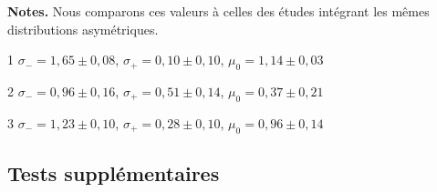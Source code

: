 \documentclass[../main/main.tex]{subfiles}
\begin{document}
\begin{table}
    \centering
        \caption[Paramètres de meilleur ajustement pour notre modélisation
        asymétrique par échantillon de la distribution d'étirement
        sous-jacente]{Paramètres de meilleur ajustement pour notre modélisation
        asymétrique par échantillon de la distribution d'étirement sous-jacente.}
        \label{tab:bbc}
    \begin{threeparttable}
        \begin{tablenotes}[flushleft]
            \item\small \textbf{\hspace{-3,2pt}Notes.} Nous comparons ces
                valeurs à celles des études intégrant les mêmes distributions
                asymétriques.
            \item [1]\small $\sigma_{-} = 1,65 \pm 0,08$, $\sigma_{+} = 0,10 \pm
                0,10$, $\mu_0 = 1,14 \pm 0,03$ \citep[Tableau~1,][]{scolnic2016}
            \item [2]\small $\sigma_{-} = 0,96 \pm 0,16$, $\sigma_{+} = 0,51 \pm
                0,14$, $\mu_0 = 0,37 \pm 0,21$ \citep[Tableau~3,][]{scolnic2018}
            \item [3]\small $\sigma_{-} = 1,23 \pm 0,10$, $\sigma_{+} = 0,28 \pm
                0,10$, $\mu_0 = 0,96 \pm 0,14$ \citep[Tableau~1,][]{scolnic2016}
        \end{tablenotes}
    \end{threeparttable}
\end{table}

\subsection{Tests supplémentaires}\label{ssec:testsupp}
\end{document}
